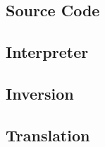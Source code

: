 \begin{appendices}

\chapter{Source Code}
\section{Interpreter}
\section{Inversion}
\section{Translation}

\end{appendices}
